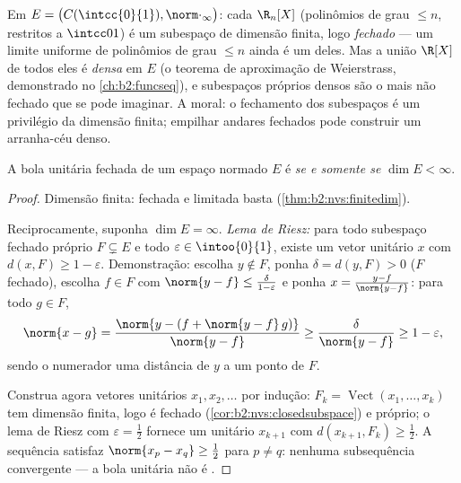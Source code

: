 \begin{example}\label{ex:b2:nvs:closeddense}
Em $E = \bigl(C(\intcc{0}{1}), \norm\cdot_\infty\bigr)$: cada
$\R_n[X]$ (polinômios de grau $\leq n$, restritos a
$\intcc01$) é um subespaço de dimensão finita, logo \emph{fechado}
--- um limite uniforme de polinômios de grau $\leq n$ ainda é um deles. Mas
a união $\R[X]$ de todos eles é \emph{densa} em $E$ (o
teorema de aproximação de Weierstrass, demonstrado no
\cref{ch:b2:funcseq}), e subespaços próprios densos são o mais
não fechado que se pode imaginar. A moral: o fechamento dos subespaços é um
privilégio da dimensão finita; empilhar andares fechados pode construir um
arranha-céu denso.
\end{example}

\begin{theorem}[Riesz]\label{thm:b2:nvs:riesz}
A bola unitária fechada de um espaço normado $E$ é  \emph{se e
somente se} $\dim E < \infty$.
\end{theorem}

\begin{proof}
Dimensão finita: fechada e limitada basta
(\cref{thm:b2:nvs:finitedim}).

Reciprocamente, suponha $\dim E = \infty$. \emph{Lema de Riesz:} para
todo subespaço fechado próprio $F \subsetneq E$ e todo $\varepsilon \in
\intoo{0}{1}$, existe um vetor unitário $x$ com $d(x, F) \geq 1 -
\varepsilon$. Demonstração: escolha $y \notin F$, ponha $\delta = d(y, F) > 0$
($F$ fechado), escolha $f \in F$ com $\norm{y - f} \leq
\frac{\delta}{1 - \varepsilon}$ e ponha $x = \frac{y - f}{\norm{y -
f}}$: para todo $g \in F$,
\[
\norm{x - g} = \frac{\norm{y - (f + \norm{y-f}\,g)}}{\norm{y - f}}
\geq \frac{\delta}{\norm{y-f}} \geq 1 - \varepsilon ,
\]
sendo o numerador uma distância de $y$ a um ponto de $F$.

Construa agora vetores unitários $x_1, x_2, \dots$ por indução: $F_k =
\operatorname{Vect}(x_1, \dots, x_k)$ tem dimensão finita, logo é
fechado (\cref{cor:b2:nvs:closedsubspace}) e próprio; o lema de Riesz
com $\varepsilon = \frac12$ fornece um unitário $x_{k+1}$ com $d(x_{k+1},
F_k) \geq \frac12$. A sequência satisfaz $\norm{x_p - x_q} \geq
\frac12$ para $p \neq q$: nenhuma subsequência convergente --- a bola unitária
não é .
\end{proof}

